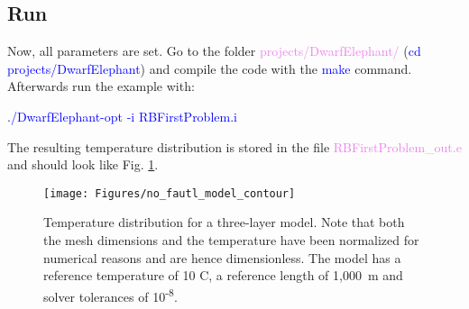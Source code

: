 \documentclass[11pt, a4paper, DIV=14]{scrartcl}
\begin{document}
\subsection{Run}
Now, all parameters are set. Go to the folder \textcolor{violet}{projects/DwarfElephant/} (\textcolor{blue}{cd projects/DwarfElephant}) and compile the code with the \textcolor{blue}{make} command. Afterwards run the example with:

 \textcolor{blue}{./DwarfElephant-opt -i RBFirstProblem.i} 
 
\noindent The resulting temperature distribution is stored in the file \textcolor{violet}{RBFirstProblem\_out.e} and should look like Fig. \ref{contour_DE}.

\begin{figure}[h]
\center
\texttt{[image: Figures/no\_fautl\_model\_contour]}
\caption{Temperature distribution for a three-layer model. Note that both the mesh dimensions and the temperature have been normalized for numerical reasons and are hence dimensionless. The model has a reference temperature of 10 \textdegree C, a reference length of \mbox{1,000 m} and solver tolerances of 10\textsuperscript{-8}.}
\label{contour_DE}
\end{figure}

  

\end{document}

